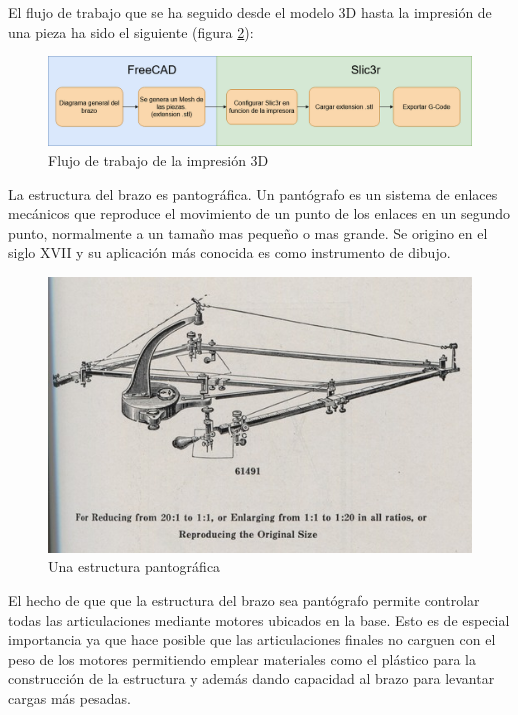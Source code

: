 El flujo de trabajo que se ha seguido desde el modelo 3D hasta la impresión de una pieza ha sido el siguiente (figura \ref{fig:flujo_3d}):

\begin{figure}[H]
    \centering
    \includegraphics[width=.9\linewidth]{pictures/flujo_trabajo_impresion.png}
    \caption{Flujo de trabajo de la impresión 3D}
    \label{fig:flujo_3d}
\end{figure}

La estructura del brazo es pantográfica. Un pantógrafo es un sistema de enlaces mecánicos que reproduce el movimiento de un punto de los enlaces en un segundo punto, normalmente a un tamaño mas pequeño o mas grande. Se origino en el siglo XVII y su aplicación más conocida es como instrumento de dibujo. 

\begin{figure}[H]
    \centering
    \includegraphics[width=.9\linewidth]{pictures/link-to-elliott-p149-suspended-pantograph-sf0.jpg}
    \caption{Una estructura pantográfica}
    \label{fig:flujo_3d}
\end{figure}

El hecho de que que la estructura del brazo sea pantógrafo permite controlar todas las articulaciones mediante motores ubicados en la base. Esto es de especial importancia ya que hace posible que las articulaciones finales no carguen con el peso de los motores permitiendo emplear materiales como el plástico para la construcción de la estructura y además dando capacidad al brazo para levantar cargas más pesadas.




